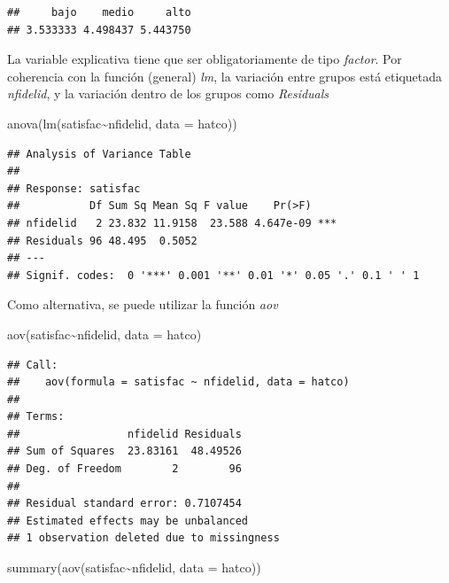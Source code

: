 \documentclass[
]{book}
\newenvironment{Shaded}{\begin{snugshade}}{\end{snugshade}}
\newcommand{\AttributeTok}[1]{\textcolor[rgb]{0.77,0.63,0.00}{#1}}
\newcommand{\FunctionTok}[1]{\textcolor[rgb]{0.00,0.00,0.00}{#1}}
\newcommand{\NormalTok}[1]{#1}
\newcommand{\SpecialCharTok}[1]{\textcolor[rgb]{0.00,0.00,0.00}{#1}}
\theoremstyle{break}
\theoremstyle{nonumberplain}
\begin{document}
\begin{verbatim}
##     bajo    medio     alto 
## 3.533333 4.498437 5.443750
\end{verbatim}

La variable explicativa tiene que ser obligatoriamente de tipo \emph{factor}.
Por coherencia con la función (general) \emph{lm}, la variación entre grupos
está etiquetada \emph{nfidelid}, y la variación dentro de los grupos como
\emph{Residuals}

\begin{Shaded}
\begin{Highlighting}[]
\FunctionTok{anova}\NormalTok{(}\FunctionTok{lm}\NormalTok{(satisfac}\SpecialCharTok{\textasciitilde{}}\NormalTok{nfidelid, }\AttributeTok{data =}\NormalTok{ hatco))}
\end{Highlighting}
\end{Shaded}

\begin{verbatim}
## Analysis of Variance Table
## 
## Response: satisfac
##           Df Sum Sq Mean Sq F value    Pr(>F)    
## nfidelid   2 23.832 11.9158  23.588 4.647e-09 ***
## Residuals 96 48.495  0.5052                      
## ---
## Signif. codes:  0 '***' 0.001 '**' 0.01 '*' 0.05 '.' 0.1 ' ' 1
\end{verbatim}

Como alternativa, se puede utilizar la función \emph{aov}

\begin{Shaded}
\begin{Highlighting}[]
\FunctionTok{aov}\NormalTok{(satisfac}\SpecialCharTok{\textasciitilde{}}\NormalTok{nfidelid, }\AttributeTok{data =}\NormalTok{ hatco)}
\end{Highlighting}
\end{Shaded}

\begin{verbatim}
## Call:
##    aov(formula = satisfac ~ nfidelid, data = hatco)
## 
## Terms:
##                 nfidelid Residuals
## Sum of Squares  23.83161  48.49526
## Deg. of Freedom        2        96
## 
## Residual standard error: 0.7107454
## Estimated effects may be unbalanced
## 1 observation deleted due to missingness
\end{verbatim}

\begin{Shaded}
\begin{Highlighting}[]
\FunctionTok{summary}\NormalTok{(}\FunctionTok{aov}\NormalTok{(satisfac}\SpecialCharTok{\textasciitilde{}}\NormalTok{nfidelid, }\AttributeTok{data =}\NormalTok{ hatco))}
\end{Highlighting}
\end{Shaded}
\end{document}
